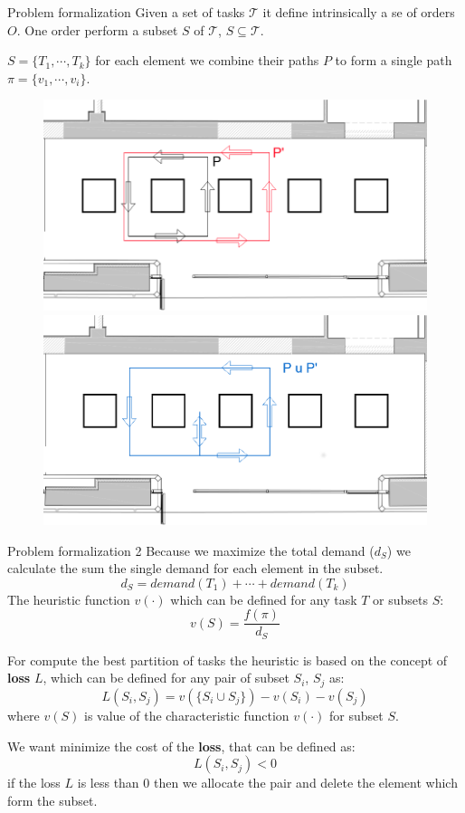     \begin{frame}[fragile]{Problem formalization}
        Given a set of tasks $\mathcal{T}$ it define intrinsically a se of orders $O$.
        One order perform a subset $S$ of $\mathcal{T}$, $S\subseteq\mathcal{T}$.

        $S = \{T_1,\cdots,T_k\}$ for each element we combine their paths $P$ to form
        a single path $\pi = \{v_1,\cdots,v_i\}$.
        \begin{figure}
           
                \includegraphics[scale=0.18]{img/p1p2_cut.png}
                \includegraphics[scale=0.18]{img/p3_cut.png}

        \end{figure}
    \end{frame}

    \begin{frame}[fragile]{Problem formalization 2}
        Because we maximize the total demand ($d_S$) we calculate the sum the single demand for each element in the subset.
\[d_S =demand(T_1) + \cdots + demand(T_k)\]
The heuristic function $v(\cdot)$ which
can be defined for any task $T$ or subsets $S$:
\[ v(S) = \frac{f(\pi)}{d_S}\]

For compute the best partition of tasks the heuristic is based on the concept of {\bf loss} $L$,
which can be defined for any pair of subset $S_i$, $S_j$ as:
\[L(S_i,S_j) = v(\{ S_i \cup S_j\}) - v(S_i) - v(S_j)\]
where $v(S)$ is value of the characteristic function $v(\cdot)$ for subset $S$.

We want minimize the cost of the {\bf loss}, that can be defined as:
\[L(S_i,S_j) < 0 \]
if the loss $L$ is less than 0 then we allocate the pair and delete the element which
form the subset.
    \end{frame}

